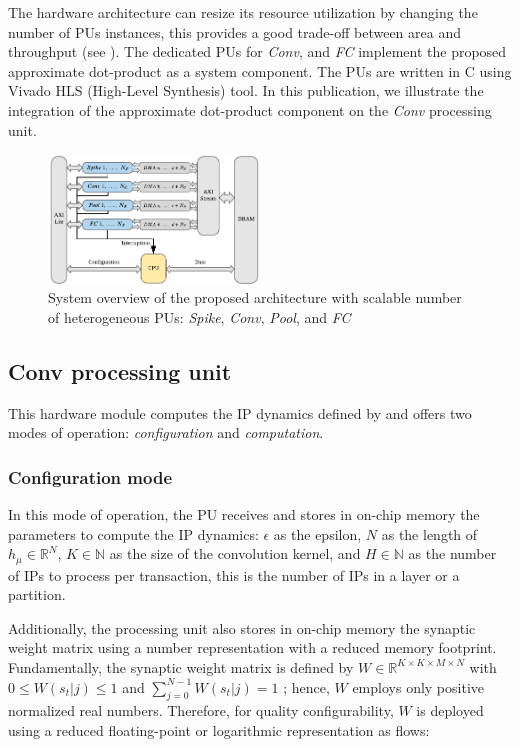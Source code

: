 The hardware architecture can resize its resource utilization by changing the number of PUs instances, this provides a good trade-off between area and throughput (see ). The dedicated PUs for \emph{Conv}, and \emph{FC} implement the proposed approximate dot-product as a system component. The PUs are written in C using Vivado HLS (High-Level Synthesis) tool. In this publication, we illustrate the integration of the approximate dot-product component on the \emph{Conv} processing unit.

\begin{figure}
	\centering
	\includegraphics[width=0.5\textwidth]{../figures/sbs_hw.pdf}
	\caption{System overview of the proposed architecture with scalable number of heterogeneous PUs: \emph{Spike}, \emph{Conv}, \emph{Pool}, and \emph{FC}}
	\label{fig:hw_sbs}
\end{figure}

\subsection{Conv processing unit}
This hardware module computes the IP dynamics defined by  and offers two modes of operation: \emph{configuration} and \emph{computation}.

\subsubsection{Configuration mode}
In this mode of operation, the PU receives and stores in on-chip memory the parameters to compute the IP dynamics: $\epsilon$ as the epsilon, $N$ as the length of $h_\mu\in\mathbb{R}^{N}$, $K\in\mathbb{N}$ as the size of the convolution kernel, and $H\in\mathbb{N}$ as the number of IPs to process per transaction, this is the number of IPs in a layer or a partition.

Additionally, the processing unit also stores in on-chip memory the synaptic weight matrix using a number representation with a reduced memory footprint. Fundamentally, the synaptic weight matrix is defined by $W\in\mathbb{R}^{K\times K\times M\times N}$ with $0\le W(s_t|j)\le1$ and $\sum_{j=0}^{N-1}W(s_t|j)=1$ \cite{rotermund2019Backpropagation}; hence, $W$ employs only positive normalized real numbers. Therefore, for quality configurability, $W$ is deployed using a reduced floating-point or logarithmic representation as flows:

